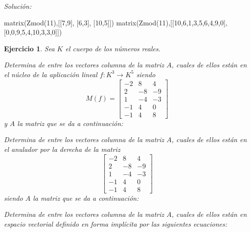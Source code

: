 \documentclass[12pt]{amsart}
\newtheorem{ejer}{Ejercicio}
\begin{document}
{\it Soluci\'on:}

\begin{sageblock}
matrix(Zmod(11),[[7,9],
[6,3],
[10,5]])
matrix(Zmod(11),[[10,6,1,3,5,6,4,9,0],
[0,0,9,5,4,10,3,3,0]])
\end{sageblock}



\begin{ejer} Sea $K$ el cuerpo de los n\'umeros reales.
\newline
\noindent\begin{minipage}{\textwidth}
\begin{tcolorbox}[colback = green!20!white,title=Versión Núcleo]
Determina de entre los vectores columna de la matriz $A$, cuales de ellos están en el núcleo de la aplicación lineal $f:K^{3} \to K^{5}$ siendo  $$ M(f) = \left[\begin{array}{rrr}
-2 & 8 & 4 \\
2 & -8 & -9 \\
1 & -4 & -3 \\
-1 & 4 & 0 \\
-1 & 4 & 8
\end{array}\right] $$ y $A$ la matriz que se da a continuación:\end{tcolorbox}
\end{minipage} \newline
\noindent\begin{minipage}{\textwidth}
\begin{tcolorbox}[colback = blue!20!white,title=Versión Anulador]
Determina de entre los vectores columna de la matriz $A$, cuales de ellos están en el anulador por la derecha de la matriz $$ \left[\begin{array}{rrr}
-2 & 8 & 4 \\
2 & -8 & -9 \\
1 & -4 & -3 \\
-1 & 4 & 0 \\
-1 & 4 & 8
\end{array}\right] $$ siendo $A$ la matriz que se da a continuación:\end{tcolorbox}
\end{minipage} \newline
\noindent\begin{minipage}{\textwidth} 
\begin{tcolorbox}[colback = red!20!white,title=Versión Ecuaciones Implícitas]
Determina de entre los vectores columna de la matriz $A$, cuales de ellos están en espacio vectorial definido en forma implícita por las siguientes ecuaciones:

\end{tcolorbox}
\end{minipage}
\end{ejer}
\end{document}
